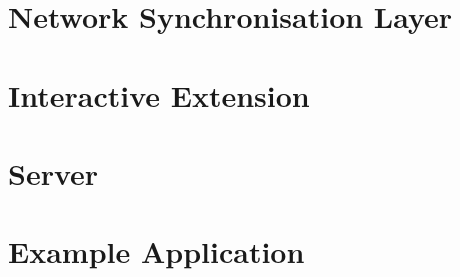 \section{Network Synchronisation Layer}
\label{sec:implementation-network-sync}


\section{Interactive Extension}
\label{sec:implementation-interactive}

\section{Server}
\label{sec:implementation-server}

\section{Example Application}
\label{sec:implementation-client}
